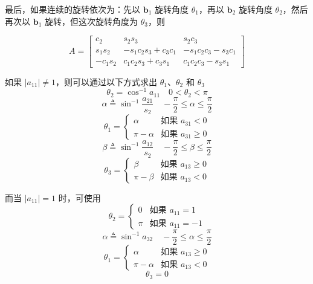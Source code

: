 最后，如果连续的旋转依次为：先以 $\mathbf{b}_1$ 旋转角度 $\theta_1$，再以 $\mathbf{b}_2$ 旋转角度 $\theta_2$，然后再次以 $\mathbf{b}_1$ 旋转，但这次旋转角度为 $\theta_3$，则

\begin{equation}\label{eq:方向角:b1b2b1}
A = \left[
\begin{array}{ccc}
c_2 & s_2 s_3 & s_2 c_3 \\
s_1 s_2 & -s_1 c_2 s_3 + c_3 c_1 & -s_1 c_2 c_3 - s_3 c_1 \\
-c_1 s_2 & c_1 c_2 s_3 + c_3 s_1 & c_1 c_2 c_3 - s_3 s_1
\end{array}
\right]
\end{equation}

如果 $|a_{11}| \ne 1$，则可以通过以下方式求出 $\theta_1$、$\theta_2$ 和 $\theta_3$
$$
\theta_2 = \cos^{-1} a_{11} \quad 0 < \theta_2 < \pi
$$
$$
\alpha \triangleq \sin^{-1} \frac{a_{21}}{s_2} \quad -\frac{\pi}{2} \le \alpha \le \frac{\pi}{2}
$$
$$
\theta_1 = \begin{cases} \alpha & \text{如果 } a_{31} < 0 \\ \pi - \alpha & \text{如果 } a_{31} \ge 0 \end{cases}
$$
$$
\beta \triangleq \sin^{-1}\frac{a_{12}}{s_2} \quad -\frac{\pi}{2} \le \beta \le \frac{\pi}{2}
$$
$$
\theta_3 = \begin{cases} \beta & \text{如果 } a_{13} \ge 0 \\ \pi - \beta & \text{如果 }a_{13} < 0 \end{cases}
$$

而当 $|a_{11}| = 1$ 时，可使用
$$
\theta_2 = \begin{cases} 0 & \text{如果 } a_{11} = 1 \\ \pi & \text{如果 } a_{11} = -1 \end{cases}
$$
$$
\alpha \triangleq \sin^{-1} a_{32} \quad -\frac{\pi}{2} \le \alpha \le \frac{\pi}{2}
$$
$$
\theta_1 = \begin{cases} \alpha & \text{如果 } a_{13} \ge 0 \\ \pi - \alpha & \text{如果 } a_{13} < 0 \end{cases}
$$
$$
\theta_3 = 0
$$



